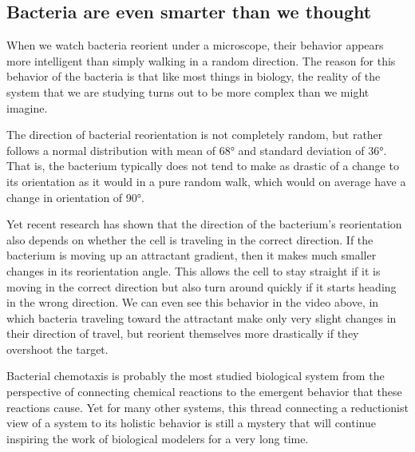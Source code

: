 %

\subsection{Bacteria are even smarter than we thought}

When we watch bacteria reorient under a microscope, their behavior appears more intelligent than simply walking in a random direction. The reason for this behavior of the bacteria is that like most things in biology, the reality of the system that we are studying turns out to be more complex than we might imagine.

The direction of bacterial reorientation is not completely random, but rather follows a normal distribution with mean of 68° and standard deviation of 36°. That is, the bacterium typically does not tend to make as drastic of a change to its orientation as it would in a pure random walk, which would on average have a change in orientation of 90°.

Yet recent research has shown that the direction of the bacterium's reorientation also depends on whether the cell is traveling in the correct direction. If the bacterium is moving up an attractant gradient, then it makes much smaller changes in its reorientation angle. This allows the cell to stay straight if it is moving in the correct direction but also turn around quickly if it starts heading in the wrong direction. We can even see this behavior in the video above, in which bacteria traveling toward the attractant make only very slight changes in their direction of travel, but reorient themselves more drastically if they overshoot the target.

Bacterial chemotaxis is probably the most studied biological system from the perspective of connecting chemical reactions to the emergent behavior that these reactions cause. Yet for many other systems, this thread connecting a reductionist view of a system to its holistic behavior is still a mystery that will continue inspiring the work of biological modelers for a very long time.\\

